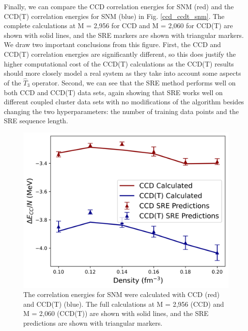 Finally, we can compare the CCD correlation energies for SNM (red) and the CCD(T) correlation energies for SNM (blue) in Fig. \ref{ccd_ccdt_snm}. The complete calculations at M = 2,956 for CCD and M = 2,060 for CCD(T) are shown with solid lines, and the SRE markers are shown with triangular markers.  We draw two important conclusions from this figure.  First, the CCD and CCD(T) correlation energies are significantly different, so this does justify the higher computational cost of the CCD(T) calculations as the CCD(T) results should more closely model a real system as they take into account some aspects of the $\hat{T}_3$ operator.  Second, we can see that the SRE method performs well on both CCD and CCD(T) data sets, again showing that SRE works well on different coupled cluster data sets with no modifications of the algorithm besides changing the two hyperparameters: the number of training data points and the SRE sequence length.


\begin{figure}
    \centering
    \includegraphics[scale=0.75]{Images/Chapter8/PRX_ORNL1_Fig3b.png}
    \caption{The correlation energies for SNM were calculated with CCD (red) and CCD(T) (blue).  The full calculations at M = 2,956 (CCD) and M = 2,060 (CCD(T)) are shown with solid lines, and the SRE predictions are shown with triangular markers.}
    \label{fig:ccd_ccdt_snm}
\end{figure}